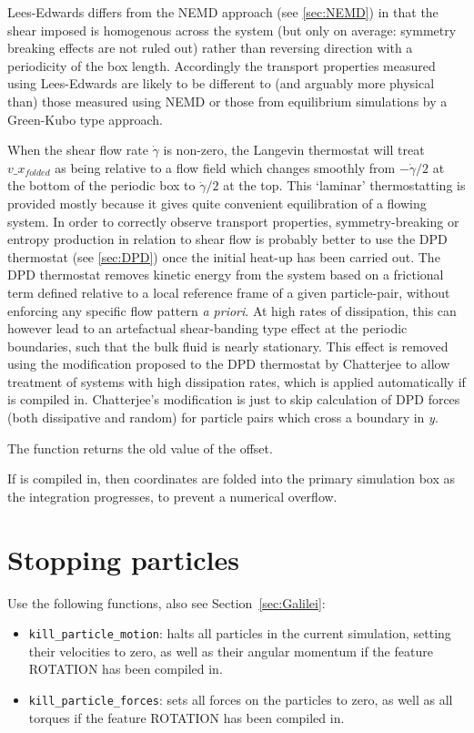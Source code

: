 Lees-Edwards differs from the NEMD approach (see \vref{sec:NEMD}) in that the shear imposed is homogenous across the system (but only on average: symmetry breaking effects are not ruled out) rather than reversing direction with a periodicity of the box length. 
Accordingly the transport properties  measured using Lees-Edwards are likely to be different to (and arguably more physical than) those measured using NEMD or those from equilibrium simulations by a Green-Kubo type approach.

When the shear flow rate $\dot{\gamma}$ is non-zero, the Langevin thermostat will treat $v\_x_{folded}$ as being relative to a flow field which changes smoothly from $-\dot{\gamma}/2$ at the bottom of the periodic box to $\dot{\gamma}/2$ at the top.  
This `laminar' thermostatting is provided mostly because it gives quite convenient equilibration of a flowing system.  In order to correctly observe transport properties, symmetry-breaking or entropy production in relation to shear flow is probably better to use the DPD thermostat (see \vref{sec:DPD}) once the initial heat-up has been carried out.  
The DPD thermostat removes kinetic energy from the system based on a frictional term defined relative to a local reference frame of a given particle-pair, without enforcing any specific flow pattern {\it a priori}.  At high rates of dissipation, this can however lead to an artefactual  shear-banding type effect at the periodic boundaries, such that the bulk fluid is nearly stationary.  
This effect is removed using the modification proposed to the DPD thermostat by Chatterjee \cite{chatterjee2007} to allow treatment of systems with high dissipation rates, which is applied automatically if  is compiled in.  Chatterjee's modification is just to skip calculation of DPD forces (both dissipative and random) for particle pairs which cross a boundary in {\it y}.

The function returns the old value of the offset.

If  is compiled in, then coordinates are folded into the primary simulation box as the integration progresses, to prevent a numerical overflow.  

\section{Stopping particles}

Use the following functions, also see Section~\ref{sec:Galilei}:
\begin{itemize}
\item \texttt{kill\_particle\_motion}: halts all particles in the
  current simulation, setting their velocities to zero, as well as
  their angular momentum if the feature ROTATION has been compiled in.
\item \texttt{kill\_particle\_forces}: sets all forces on the
  particles to zero, as well as all torques if the feature ROTATION
  has been compiled in.
\end{itemize}

